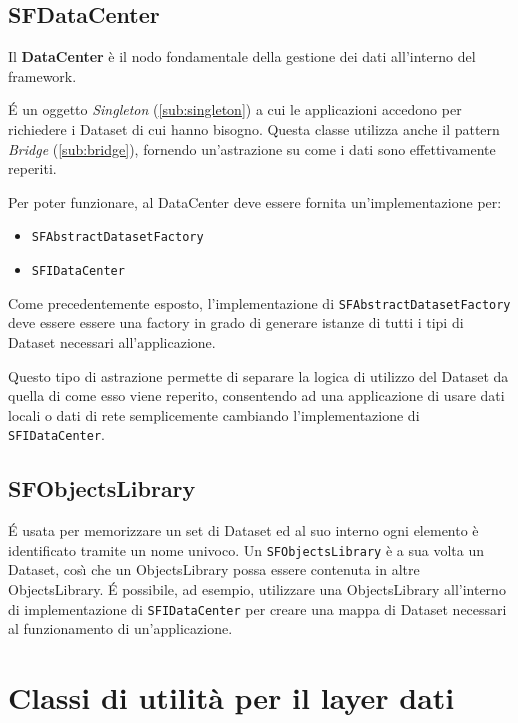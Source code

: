 \subsection{SFDataCenter}
\label{sub:sfdatacenter} 
Il \textbf{DataCenter} \`e il nodo fondamentale della gestione dei dati all'interno del framework. 

\'E un oggetto \textit{Singleton} (\ref{sub:singleton}) a cui le applicazioni accedono per richiedere i Dataset di cui hanno bisogno. Questa classe utilizza anche il pattern \textit{Bridge} (\ref{sub:bridge}), fornendo un'astrazione su come i dati sono effettivamente reperiti.

Per poter funzionare, al DataCenter deve essere fornita un'implementazione per:
\begin{itemize}
	\item \texttt{SFAbstractDatasetFactory}
	\item \texttt{SFIDataCenter}
\end{itemize}

Come precedentemente esposto, l'implementazione di \texttt{SFAbstractDatasetFactory} deve essere essere una factory in grado di generare istanze di tutti i tipi di Dataset necessari all'applicazione.

Questo tipo di astrazione permette di separare la logica di utilizzo del Dataset da quella di come esso viene reperito, consentendo ad una applicazione di usare dati locali o dati di rete semplicemente cambiando l'implementazione di \texttt{SFIDataCenter}.

\subsection{SFObjectsLibrary}
\label{sub:sfobjectslibrary}
\'E usata per memorizzare un set di Dataset ed al suo interno ogni elemento \`e identificato tramite un nome univoco.
Un \texttt{SFObjectsLibrary} \`e a sua volta un Dataset, cos{\`\i} che un ObjectsLibrary possa essere contenuta in altre ObjectsLibrary.
\'E possibile, ad esempio, utilizzare una ObjectsLibrary all'interno di implementazione di \texttt{SFIDataCenter} per creare una mappa di Dataset necessari al funzionamento di un'applicazione.

\section{Classi di utilit\`a per il layer dati}

